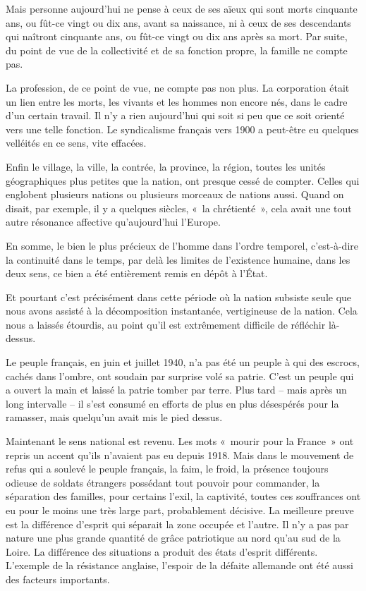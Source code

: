 \documentclass[french,twoside]{book} %
\begin{document}
Mais personne aujourd'hui ne pense à ceux de ses aïeux qui sont morts cinquante ans, ou fût-ce vingt ou dix ans, avant sa naissance, ni à ceux de ses descendants qui naîtront cinquante ans, ou fût-ce vingt ou dix ans après sa mort. Par suite, du point de vue de la collectivité et de sa fonction propre, la famille ne compte pas.\par
La profession, de ce point de vue, ne compte pas non plus. La corporation était un lien entre les morts, les vivants et les hommes non encore nés, dans le cadre d'un certain travail. Il n'y a rien aujourd'hui qui soit si peu que ce soit orienté vers une telle fonction. Le syndicalisme français vers 1900 a peut-être eu quelques velléités en ce sens, vite effacées.\par
Enfin le village, la ville, la contrée, la province, la région, toutes les unités géographiques plus petites que la nation, ont presque cessé de compter. Celles qui englobent plusieurs nations ou plusieurs morceaux de nations aussi. Quand on disait, par exemple, il y a quelques siècles, « la chrétienté », cela avait une tout autre résonance affective qu'aujourd'hui l'Europe.\par
En somme, le bien le plus précieux de l'homme dans l'ordre temporel, c'est-à-dire la continuité dans le temps, par delà les limites de l'existence humaine, dans les deux sens, ce bien a été entièrement remis en dépôt à l'État.\par
Et pourtant c'est précisément dans cette période où la nation subsiste seule que nous avons assisté à la décomposition instantanée, vertigineuse de la nation. Cela nous a laissés étourdis, au point qu'il est extrêmement difficile de réfléchir là-dessus.\par
Le peuple français, en juin et juillet 1940, n'a pas été un peuple à qui des escrocs, cachés dans l'ombre, ont soudain par surprise volé sa patrie. C'est un peuple qui a ouvert la main et laissé la patrie tomber par terre. Plus tard – mais après un long intervalle – il s'est consumé en efforts de plus en plus désespérés pour la ramasser, mais quelqu'un avait mis le pied dessus.\par
Maintenant le sens national est revenu. Les mots « mourir pour la France » ont repris un accent qu'ils n'avaient pas eu depuis 1918. Mais dans le mouvement de refus qui a soulevé le peuple français, la faim, le froid, la présence toujours odieuse de soldats étrangers possédant tout pouvoir pour commander, la séparation des familles, pour certains l'exil, la captivité, toutes ces souffrances ont eu pour le moins une très large part, probablement décisive. La meilleure preuve est la différence d'esprit qui séparait la zone occupée et l'autre. Il n'y a pas par nature une plus grande quantité de grâce patriotique au nord qu'au sud de la Loire. La différence des situations a produit des états d'esprit différents. L'exemple de la résistance anglaise, l'espoir de la défaite allemande ont été aussi des facteurs importants.\par
\end{document}
